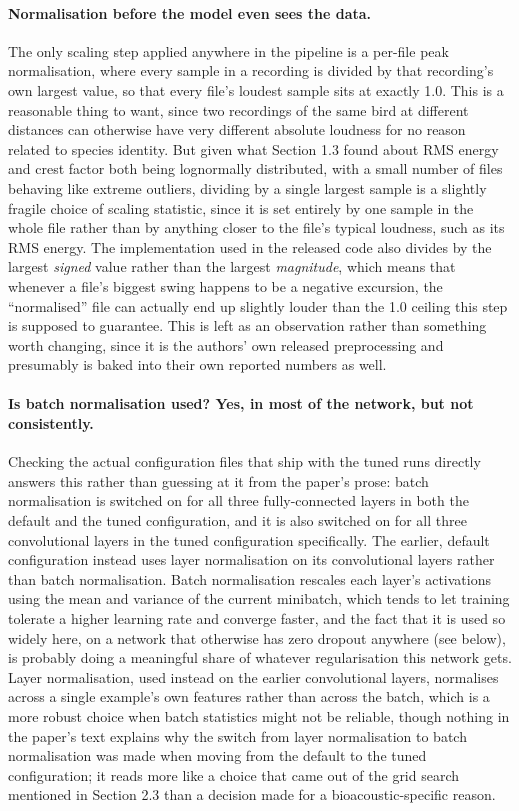 \documentclass[11pt]{article}
\begin{document}
\paragraph{Normalisation before the model even sees the data.} The only scaling step applied anywhere in the pipeline is a per-file peak normalisation, where every sample in a recording is divided by that recording's own largest value, so that every file's loudest sample sits at exactly 1.0. This is a reasonable thing to want, since two recordings of the same bird at different distances can otherwise have very different absolute loudness for no reason related to species identity. But given what Section 1.3 found about RMS energy and crest factor both being lognormally distributed, with a small number of files behaving like extreme outliers, dividing by a single largest sample is a slightly fragile choice of scaling statistic, since it is set entirely by one sample in the whole file rather than by anything closer to the file's typical loudness, such as its RMS energy. The implementation used in the released code also divides by the largest \emph{signed} value rather than the largest \emph{magnitude}, which means that whenever a file's biggest swing happens to be a negative excursion, the ``normalised'' file can actually end up slightly louder than the 1.0 ceiling this step is supposed to guarantee. This is left as an observation rather than something worth changing, since it is the authors' own released preprocessing and presumably is baked into their own reported numbers as well.

\paragraph{Is batch normalisation used? Yes, in most of the network, but not consistently.} Checking the actual configuration files that ship with the tuned runs directly answers this rather than guessing at it from the paper's prose: batch normalisation is switched on for all three fully-connected layers in both the default and the tuned configuration, and it is also switched on for all three convolutional layers in the tuned configuration specifically. The earlier, default configuration instead uses layer normalisation on its convolutional layers rather than batch normalisation. Batch normalisation rescales each layer's activations using the mean and variance of the current minibatch, which tends to let training tolerate a higher learning rate and converge faster, and the fact that it is used so widely here, on a network that otherwise has zero dropout anywhere (see below), is probably doing a meaningful share of whatever regularisation this network gets. Layer normalisation, used instead on the earlier convolutional layers, normalises across a single example's own features rather than across the batch, which is a more robust choice when batch statistics might not be reliable, though nothing in the paper's text explains why the switch from layer normalisation to batch normalisation was made when moving from the default to the tuned configuration; it reads more like a choice that came out of the grid search mentioned in Section 2.3 than a decision made for a bioacoustic-specific reason.
\end{document}
